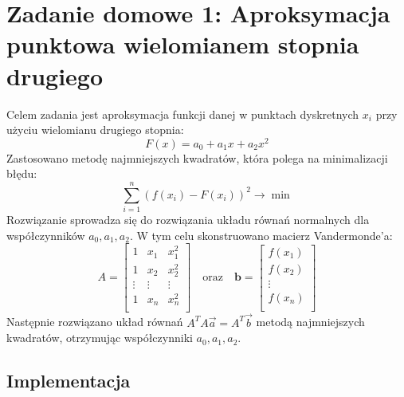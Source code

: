 \documentclass{article}
\begin{document}
\section{Zadanie domowe 1: Aproksymacja punktowa wielomianem stopnia drugiego}

Celem zadania jest aproksymacja funkcji danej w punktach dyskretnych \( x_i \) przy użyciu wielomianu drugiego stopnia:
\[
F(x) = a_0 + a_1 x + a_2 x^2
\]
Zastosowano metodę najmniejszych kwadratów, która polega na minimalizacji błędu:
\[
\sum_{i=1}^{n} (f(x_i) - F(x_i))^2 \to \min
\]
Rozwiązanie sprowadza się do rozwiązania układu równań normalnych dla współczynników \( a_0, a_1, a_2 \). W tym celu skonstruowano macierz Vandermonde’a:
\[
A = \begin{bmatrix}
1 & x_1 & x_1^2 \\
1 & x_2 & x_2^2 \\
\vdots & \vdots & \vdots \\
1 & x_n & x_n^2 \\
\end{bmatrix}
\quad
\text{oraz}
\quad
\mathbf{b} = \begin{bmatrix}
f(x_1) \\
f(x_2) \\
\vdots \\
f(x_n) \\
\end{bmatrix}
\]
Następnie rozwiązano układ równań \( A^T A \vec{a} = A^T \vec{b} \) metodą najmniejszych kwadratów, otrzymując współczynniki \( a_0, a_1, a_2 \).

\subsection{Implementacja}
\end{document}
